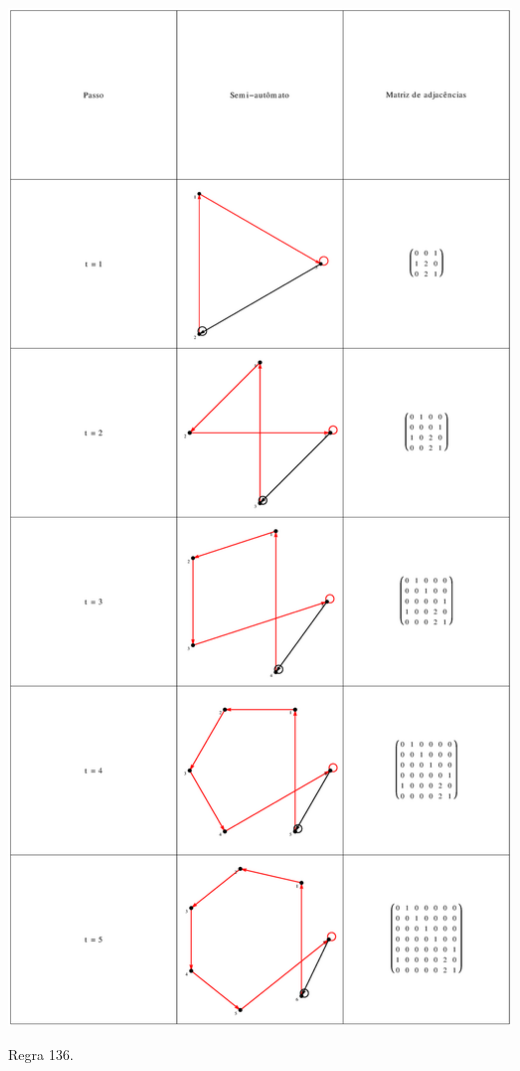 \documentclass[12pt,a4paper]{article}
\begin{document}
\begin{table}[H]
\begin{center}
\includegraphics[scale=0.32]{img/mat/matr136.eps}
\caption{Regra 136.}
\label{tab:mr136}
\end{center}
\end{table}
\end{document}
